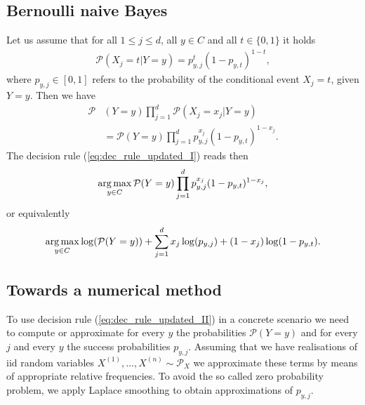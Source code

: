 \subsection{Bernoulli naive Bayes}

	Let us assume that for all $1\leq j\leq d$, all $y\in C$ and all $t\in\{0, 1\}$ it holds
	\begin{align*}
		\mathcal{P}(X_{j} = t | Y = y) = p_{y, j}^{t} (1 - p_{y, t})^{1 - t},
	\end{align*}
	where $p_{y, j}\in [0, 1]$ refers to the probability of the conditional event $X_{j}=t$, given $Y=y$. Then we have
	\begin{align*}
	 	\mathcal{P}&(Y = y) \prod_{j = 1}^{d}\mathcal{P}(X_{j} = x_{j} | Y = y) \\
			&= \mathcal{P}(Y = y) \prod_{j = 1}^{d} p_{y, j}^{x_{j}} (1 - p_{y, t})^{1 - x_{j}}.
	\end{align*}
	The decision rule (\ref{eq:dec_rule_updated_I}) reads then
	\begin{align*}
		\operatorname*{arg\,max}_{y\in C} \mathcal{P}(Y = y) \prod_{j = 1}^{d} p_{y, j}^{x_{j}} (1 - p_{y, t})^{1 - x_{j}},
	\end{align*}
	or equivalently
	\begin{align}\label{eq:dec_rule_updated_II}
		\operatorname*{arg\,max}_{y\in C} \log(\mathcal{P}(Y = y)) + \sum_{j = 1}^{d}x_{j} \log(p_{y, j}) + (1 - x_{j}) \log(1 - p_{y, t}).
	\end{align}

\subsection{Towards a numerical method}

	To use decision rule (\ref{eq:dec_rule_updated_II}) in a concrete scenario we need to compute or approximate for every $y$ the
	probabilities $\mathcal{P}(Y = y)$ and for every $j$ and every $y$ the success probabilities $p_{y, j}$. Assuming that we have
	realisations of iid random variables $X^{(1)}, \ldots, X^{(n)}\sim\mathcal{P}_{X}$ we approximate these terms by means of 
	appropriate relative frequencies. To avoid the so called zero probability problem, we apply Laplace smoothing to obtain 
	approximations of $p_{y, j}$.  

